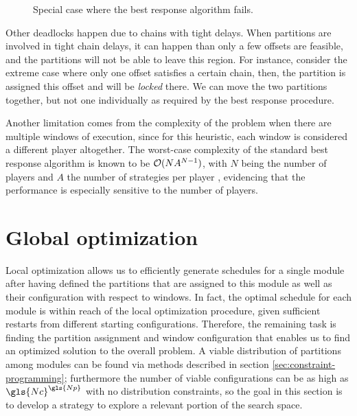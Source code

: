 \documentclass[main.tex]{subfiles}
\begin{document}
\begin{figure}[htbp]
    \centering
    \resizebox{!}{1.7cm}{}
    \caption{Special case where the best response algorithm fails.}
    \label{fig:packed-issue}
\end{figure}

Other deadlocks happen due to chains with tight delays.
When partitions are involved in tight chain delays, it can happen than only a few offsets are feasible, and the partitions will not be able to leave this region.
For instance, consider the extreme case where only one offset satisfies a certain chain, then, the partition is assigned this offset and will be \textit{locked} there.
We can move the two partitions together, but not one individually as required by the best response procedure.

Another limitation comes from the complexity of the problem when there are multiple windows of execution, since for this heuristic, each window is considered a different player altogether.
The worst-case complexity of the standard best response algorithm is known to be $\mathcal{O}(NA^{N-1})$, with $N$ being the number of players and $A$ the number of strategies per player \cite{durand2016complexity}, evidencing that the performance is especially sensitive to the number of players.

\section{Global optimization}
\label{sec:global}

Local optimization allows us to efficiently generate schedules for a single module after having defined the partitions that are assigned to this module as well as their configuration with respect to windows.
In fact, the optimal schedule for each module is within reach of the local optimization procedure, given sufficient restarts from different starting configurations.
Therefore, the remaining task is finding the partition assignment and window configuration that enables us to find an optimized solution to the overall problem.
A viable distribution of partitions among modules can be found via methods described in section \ref{sec:constraint-programming}; furthermore the number of viable configurations can be as high as $\gls{Nc}^{\gls{Np}}$ with no distribution constraints, so the goal in this section is to develop a strategy to explore a relevant portion of the search space.
\end{document}
